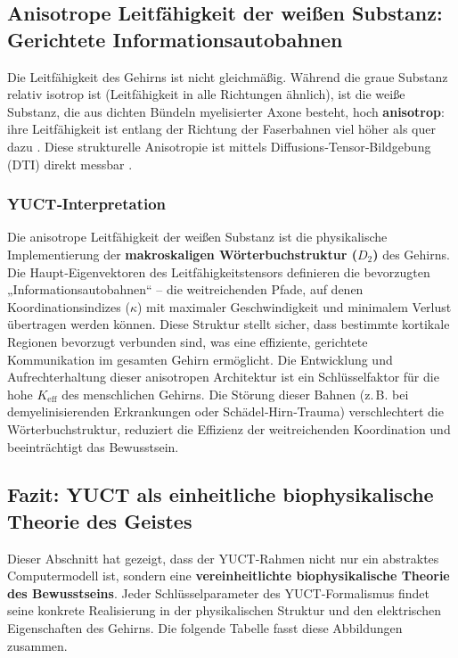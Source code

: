 \documentclass[12pt,a4paper]{article}
\begin{document}
	\subsection{Anisotrope Leitfähigkeit der weißen Substanz: Gerichtete Informationsautobahnen}
	
	Die Leitfähigkeit des Gehirns ist nicht gleichmäßig. Während die graue Substanz relativ isotrop ist (Leitfähigkeit in alle Richtungen ähnlich), ist die weiße Substanz, die aus dichten Bündeln myelisierter Axone besteht, hoch \textbf{anisotrop}: ihre Leitfähigkeit ist entlang der Richtung der Faserbahnen viel höher als quer dazu \cite{Tuch2001}. Diese strukturelle Anisotropie ist mittels Diffusions‑Tensor‑Bildgebung (DTI) direkt messbar \cite{Wu2018}.
	
	\subsubsection*{YUCT‑Interpretation}
	Die anisotrope Leitfähigkeit der weißen Substanz ist die physikalische Implementierung der \textbf{makroskaligen Wörterbuchstruktur (\(D_2\))} des Gehirns. Die Haupt‑Eigenvektoren des Leitfähigkeitstensors definieren die bevorzugten „Informationsautobahnen“ – die weitreichenden Pfade, auf denen Koordinationsindizes (\(\kappa\)) mit maximaler Geschwindigkeit und minimalem Verlust übertragen werden können. Diese Struktur stellt sicher, dass bestimmte kortikale Regionen bevorzugt verbunden sind, was eine effiziente, gerichtete Kommunikation im gesamten Gehirn ermöglicht. Die Entwicklung und Aufrechterhaltung dieser anisotropen Architektur ist ein Schlüsselfaktor für die hohe \(K_{\mathrm{eff}}\) des menschlichen Gehirns. Die Störung dieser Bahnen (z. B. bei demyelinisierenden Erkrankungen oder Schädel‑Hirn‑Trauma) verschlechtert die Wörterbuchstruktur, reduziert die Effizienz der weitreichenden Koordination und beeinträchtigt das Bewusstsein.
	
	\subsection{Fazit: YUCT als einheitliche biophysikalische Theorie des Geistes}
	
	Dieser Abschnitt hat gezeigt, dass der YUCT‑Rahmen nicht nur ein abstraktes Computermodell ist, sondern eine \textbf{vereinheitlichte biophysikalische Theorie des Bewusstseins}. Jeder Schlüsselparameter des YUCT‑Formalismus findet seine konkrete Realisierung in der physikalischen Struktur und den elektrischen Eigenschaften des Gehirns. Die folgende Tabelle fasst diese Abbildungen zusammen.
	
\end{document}
